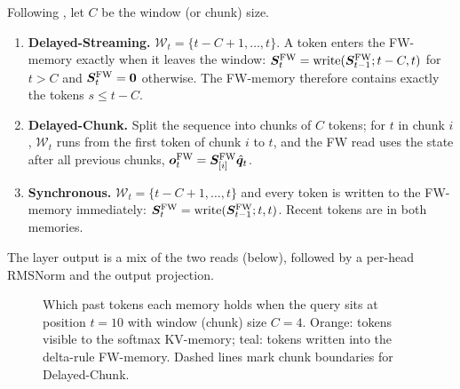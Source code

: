 \begin{definition}\label{def:c12-hqlt-schemes}
Following \citet{irie2025blending}, let $C$ be the window (or chunk) size.
\begin{enumerate}
  \item \textbf{Delayed-Streaming.} $\mathcal{W}_t = \{t-C+1,\dots,t\}$. A token enters the
  FW-memory exactly when it leaves the window: $\bm{S}^{\mathrm{FW}}_t =
  \mathrm{write}(\bm{S}^{\mathrm{FW}}_{t-1}; t-C, t)$ for $t>C$ and $\bm{S}^{\mathrm{FW}}_t = \bm0$
  otherwise. The FW-memory therefore contains exactly the tokens $s\le t-C$.
  \item \textbf{Delayed-Chunk.} Split the sequence into chunks of $C$ tokens; for $t$ in chunk
  $i$, $\mathcal{W}_t$ runs from the first token of chunk $i$ to $t$, and the FW read uses the
  state after all previous chunks, $\bm{o}^{\mathrm{FW}}_t = \bm{S}^{\mathrm{FW}}_{[i]}\hat{\bm{q}}_t$.
  \item \textbf{Synchronous.} $\mathcal{W}_t = \{t-C+1,\dots,t\}$ and every token is written to
  the FW-memory immediately: $\bm{S}^{\mathrm{FW}}_t = \mathrm{write}(\bm{S}^{\mathrm{FW}}_{t-1}; t,
  t)$. Recent tokens are in both memories.
\end{enumerate}
The layer output is a mix of the two reads (below), followed by a per-head RMSNorm and the
output projection.
\end{definition}

\begin{figure}[t]
\centering
{}
\caption{Which past tokens each memory holds when the query sits at position $t=10$ with window
(chunk) size $C=4$. Orange: tokens visible to the softmax KV-memory; teal: tokens written into the
delta-rule FW-memory. Dashed lines mark chunk boundaries for Delayed-Chunk.}
\label{fig:c12-hqlt-schemes}
\end{figure}

